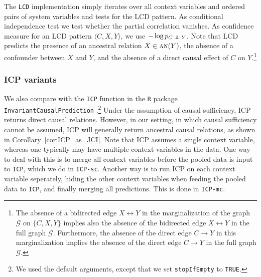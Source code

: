 \documentclass[twoside,11pt]{article}
\DeclareMathOperator*{\CI}{{\,\perp\mkern-12mu\perp\,}}
\newcommand\C[1]{\mathcal{#1}}
\newcommand\mathbfsc[1]{\text{\normalfont\scshape#1}}
\newcommand\an[1]{\mathbfsc{an}(#1)}
\newcommand{\oto}{\leftrightarrow}
\newcommand{\alg}[1]{\texttt{#1}}
\begin{document}
The \alg{LCD} implementation simply iterates over all context variables and
ordered pairs of system variables and tests for the LCD pattern. As
conditional independence test we test whether the partial correlation vanishes.
As confidence measure for an LCD pattern $\langle C,X,Y\rangle$, we use $-\log p_{C\CI Y}$.
Note that LCD predicts the presence of an ancestral relation $X \in \an{Y}$, the absence of
a confounder between $X$ and $Y$, and the absence of a direct causal effect of $C$ on $Y$.\footnote{The absence of a bidirected edge $X \oto Y$ in the marginalization of the graph $\C{G}$ on $\{C,X,Y\}$
implies also the absence of the bidirected edge $X \oto Y$ in the full graph $\C{G}$. Furthermore, the
absence of the direct edge $C \to Y$ in this marginalization implies the absence of the direct edge $C \to Y$ in the full
graph $\C{G}$.}



\subsubsection{ICP variants}
We also compare with the \texttt{ICP} function in the \texttt{R} package \texttt{InvariantCausalPrediction} \citep{ICP2016}.\footnote{We used the default arguments, except that we set \texttt{stopIfEmpty} to \texttt{TRUE}.}
Under the assumption of causal sufficiency, ICP returns direct causal relations. However,
in our setting, in which causal sufficiency cannot be assumed, ICP will generally return
ancestral causal relations, as shown in Corollary~\ref{cor:ICP_as_JCI}. Note that ICP
assumes a single context variable, whereas one typically may have multiple context variables
in the data. One way to deal with this is to merge all context variables before the pooled
data is input to \texttt{ICP}, which we do in \alg{ICP-sc}. Another way is to run ICP 
on each context variable seperately, hiding the other context variables when feeding the
pooled data to \texttt{ICP}, and finally merging all predictions. This is done in \alg{ICP-mc}. 
\end{document}
